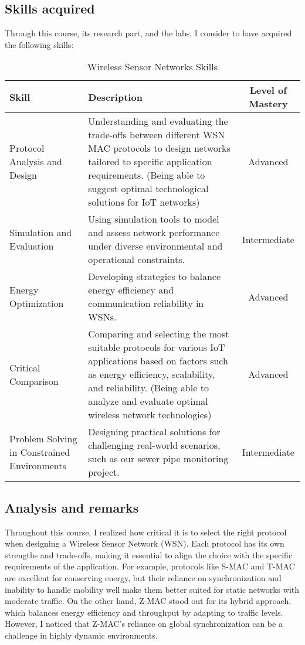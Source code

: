 \subsection{Skills acquired}
Through this course, its research part, and the labs, I consider to have acquired the following skills:

\begin{table}[H]
    \centering
    \renewcommand{\arraystretch}{1.5} %
    \begin{tabular}{|p{3.5cm}|p{8.5cm}|c|}
    \hline
    \rowcolor[gray]{0.8}
    \textbf{Skill} & \textbf{Description} & \textbf{Level of Mastery} \\
    \hline
    Protocol Analysis and Design & Understanding and evaluating the trade-offs between different WSN MAC protocols to design networks tailored to specific application requirements. (Being able to suggest optimal technological solutions for IoT networks) & Advanced \\
    \hline
    Simulation and Evaluation & Using simulation tools to model and assess network performance under diverse environmental and operational constraints. & Intermediate \\
    \hline
    Energy Optimization & Developing strategies to balance energy efficiency and communication reliability in WSNs. & Advanced \\
    \hline
    Critical Comparison & Comparing and selecting the most suitable protocols for various IoT applications based on factors such as energy efficiency, scalability, and reliability. (Being able to analyze and evaluate optimal wireless network technologies) & Advanced \\
    \hline
    Problem Solving in Constrained Environments & Designing practical solutions for challenging real-world scenarios, such as our sewer pipe monitoring project. & Intermediate \\
    \hline
    \end{tabular}
    \caption{Wireless Sensor Networks Skills}
    \label{tab:wsn_skills}
\end{table}

\subsection{Analysis and remarks}

\indent \indent Throughout this course, I realized how critical it is to select the right protocol when designing a Wireless Sensor Network (WSN). Each protocol has its own strengths and trade-offs, making it essential to align the choice with the specific requirements of the application.
For example, protocols like S-MAC and T-MAC are excellent for conserving energy, but their reliance on synchronization and inability to handle mobility well make them better suited for static networks with moderate traffic. On the other hand, Z-MAC stood out for its hybrid approach, which balances energy efficiency and throughput by adapting to traffic levels. However, I noticed that Z-MAC's reliance on global synchronization can be a challenge in highly dynamic environments.
\vspace{0.25cm}

